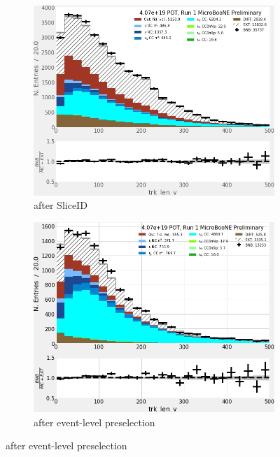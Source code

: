 \begin{figure}[H] 
\begin{center}
    \begin{subfigure}[b]{0.3\textwidth}
    \centering
    \includegraphics[width=1.00\textwidth]{NuMuCCsel/Images/Ryan/Run1_trklen_justSlice.jpg}
    \caption{\label{fig:NuMUCCsel:ryan:trklenSliceID} after SliceID}
    \end{subfigure}
    \begin{subfigure}[b]{0.3\textwidth}
    \centering
    \includegraphics[width=1.00\textwidth]{NuMuCCsel/Images/Ryan/Run1_trklen_justEvtsel.jpg}
    \caption{\label{fig:NuMUCCsel:ryan:trklenEvt} after event-level preselection}

\end{subfigure}
\end{center}
\end{figure}
